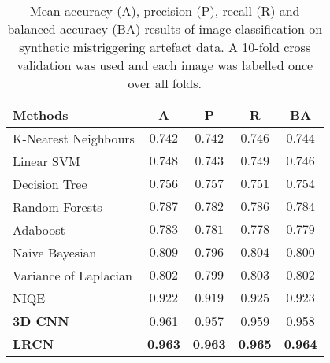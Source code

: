 \documentclass[preprint,12pt,authoryear]{elsarticle}
\begin{document}
\begin{table}
\centering
\caption{Mean accuracy (A), precision (P), recall (R) and balanced accuracy (BA) results of image classification on synthetic mistriggering artefact data. A 10-fold cross validation was used and each image was labelled once over all folds.}
\begin{tabular}{lcccc}
\hline
Methods    & A & P & R  & BA\\
\hline

K-Nearest Neighbours  & $0.742$  & $0.742$  & $0.746$    & $0.744$     \\
Linear SVM    & $ 0.748 $  & $0.743$  & $0.749$  & $0.746$   \\
Decision Tree   &   $ 0.756 $  & $0.757$  & $0.751$  & $0.754$   \\
Random Forests   & $0.787$    & $0.782$  & $0.786$   & $0.784$  \\
Adaboost   & $0.783 $  & $0.781$  & $0.778$       & $0.779$   \\
Naive Bayesian   & $0.809$  & $0.796$  & $0.804$    & $0.800$     \\
Variance of Laplacian  & $0.802$  & $0.799$ & $0.803$   & $0.802$   \\
NIQE \citep{Mittal2013}  & $0.922$  & $0.919 $& $0.925$  & $0.923$     \\
\hline
\textbf{3D CNN }    & 0.961 & 0.957 & 0.959  & 0.958     \\
\textbf{LRCN }   & \textbf{0.963} &  \textbf{0.963} & \textbf{0.965} &  \textbf{0.964}  \\


\hline
\end{tabular}
\label{table:synmis}
\end{table}


\end{document}
